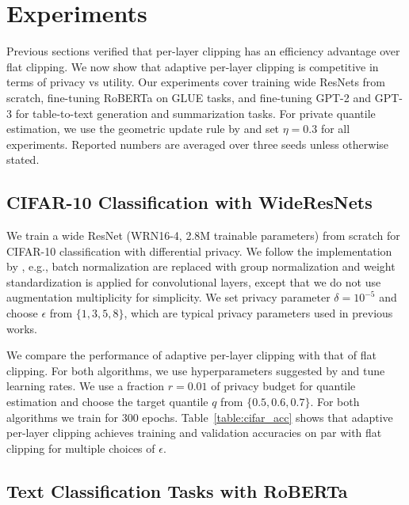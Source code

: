 \section{Experiments}\label{sec:experiment}

Previous sections verified that per-layer clipping has an efficiency advantage over flat clipping. 
We now show that adaptive per-layer clipping is competitive in terms of privacy vs utility.
Our experiments cover training wide ResNets from scratch, fine-tuning RoBERTa on GLUE tasks, and fine-tuning GPT-2 and GPT-3 for table-to-text generation and summarization tasks. For private quantile estimation, we use the geometric update rule by \cite{andrew2019differentially} and set $\eta=0.3$ for all experiments.
Reported numbers are averaged over three seeds unless otherwise stated.



\subsection{CIFAR-10 Classification with WideResNets}\label{subsec:cifar10}

We train a wide ResNet (WRN16-4, 2.8M trainable parameters) \citep{zagoruyko2016wide} from scratch for CIFAR-10 classification with differential privacy. We follow the implementation by  \cite{de2022unlocking}, e.g.,  batch normalization are replaced with group normalization and weight standardization is applied for convolutional layers, except that we do not use augmentation multiplicity for simplicity.
We set privacy parameter $\delta= 10^{-5}$ and choose $\epsilon$ from $\{1,3,5,8\}$, which are typical privacy parameters used in previous works.

We compare the performance of adaptive per-layer clipping with that of flat clipping. 
For both algorithms, we use  hyperparameters suggested by \cite{de2022unlocking}  and tune learning rates. %
We use a fraction $r=0.01$ of privacy budget for quantile estimation and choose the target quantile $q$ from $\{0.5, 0.6, 0.7\}$. For both algorithms we train for 300 epochs. 
Table~\ref{table:cifar_acc} shows that adaptive per-layer clipping achieves  training and validation accuracies on par with flat clipping for multiple choices of $\epsilon$. %




\subsection{Text Classification Tasks with RoBERTa} \label{subsec:roberta}

